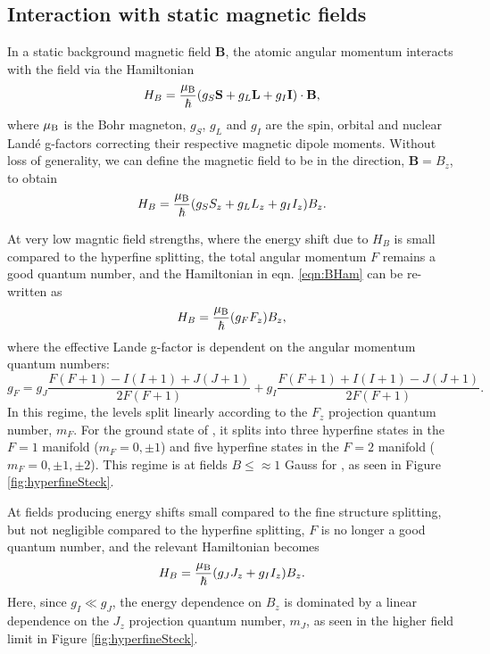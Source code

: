 \subsection{Interaction with static magnetic fields}\label{sec:hyperfineField}
In a static background magnetic field $\mathbf{B}$, the atomic angular momentum interacts with the field via the Hamiltonian
\begin{equation}
H_B = \frac{\mu_{\rm B}}{\hbar}(g_S\mathbf{S}+g_L\mathbf{L}+g_I\mathbf{I})\cdot\mathbf{B},
\end{equation}
where $\mu_{\rm B}$ is the Bohr magneton, $g_S$, $g_L$ and $g_I$ are the spin, orbital and nuclear Land\'e g-factors correcting their respective magnetic dipole moments. Without loss of generality, we can define the magnetic field to be in the \ez{} direction, $\mathbf{B}=B_z$\ez{}, to obtain
\begin{equation}
H_B = \frac{\mu_{\rm B}}{\hbar}(g_S S_z+g_L L_z+g_I I_z) B_z.
\label{eqn:BHam}
\end{equation}

At very low magntic field strengths, where the energy shift due to $H_B$ is small compared to the hyperfine splitting, the total angular momentum $F$ remains a good quantum number, and the Hamiltonian in eqn. \ref{eqn:BHam} can be re-written as
\begin{equation}
H_B = \frac{\mu_{\rm B}}{\hbar}(g_F F_z) B_z,
\label{eqn:BHam}
\end{equation}
where the effective Lande g-factor is dependent on the angular momentum quantum numbers:
\begin{equation}
g_F = g_J\frac{F(F+1)-I(I+1)+J(J+1)}{2F(F+1)} + g_I\frac{F(F+1)+I(I+1)-J(J+1)}{2F(F+1)}.
\end{equation}
In this regime, the levels split linearly according to the $F_z$ projection quantum number, $m_F$. For the ground state of \Rb{}, it splits into three hyperfine states in the $F=1$ manifold ($m_F=0,\pm1$) and five hyperfine states in the $F=2$ manifold ($m_F=0,\pm1,\pm2$). This regime is at fields $B\leq\approx1$ Gauss for \Rb{}, as seen in Figure \ref{fig:hyperfineSteck}. 

At fields producing energy shifts small compared to the fine structure splitting, but not negligible compared to the hyperfine splitting, $F$ is no longer a good quantum number, and the relevant Hamiltonian becomes
\begin{equation}
H_B = \frac{\mu_{\rm B}}{\hbar}(g_J J_z+g_I I_z) B_z.
\end{equation}
Here, since $g_I \ll g_J$, the energy dependence on $B_z$ is dominated by a linear dependence on the $J_z$ projection quantum number, $m_J$, as seen in the higher field limit in Figure \ref{fig:hyperfineSteck}. 

